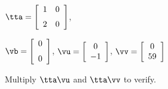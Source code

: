 {$\tta = \left[ \begin {array}{cc} 1&0\\ \noalign{\medskip}2&0 \end {array} \right] $,
 
$\vb=\left[ \begin {array}{c} 0\\ \noalign{\medskip}0 \end {array} \right] $, 
$\vu = \left[ \begin {array}{c} 0\\ -1 \end{array} \right]$, $\vv = \left[ \begin{array}{c} 0\\ 59 \end{array} \right] $}
{Multiply $\tta\vu$ and $\tta\vv$ to verify.}





